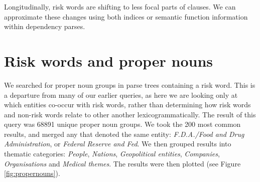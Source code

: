     \vspace{5mm}\noindent\begin{tcolorbox}[colback=yellow!5,colframe=yellow!40!black,title=Summary: risk and arguability]
    \parbox{1\textwidth}{%
    Longitudinally, risk words are shifting to less focal parts of clauses. We can approximate these changes using both indices or semantic function information within dependency parses.}
    \end{tcolorbox}
    \vspace{5mm}

\section{Risk words and proper nouns} \FloatBarrier

    We searched for proper noun groups in parse trees containing a risk word. This is a departure from many of our earlier queries, as here we are looking only at which entities co-occur with risk words, rather than determining how risk words and non-risk words relate to other another lexicogrammatically. The result of this query was 68891 unique proper noun groups. We took the 200 most common results, and merged any that denoted the same entity: \emph{F.D.A.\slash Food and Drug Administration}, or \emph{Federal Reserve and Fed}. We then grouped results into thematic categories: \emph{People}, \emph{Nations}, \emph{Geopolitical entities}, \emph{Companies}, \emph{Organisations} and \emph{Medical themes}. The results were then plotted (see Figure \ref{fig:propernouns}). 

